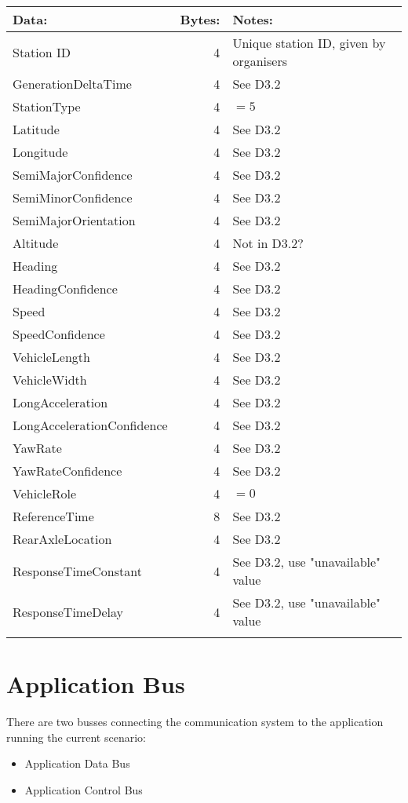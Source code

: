 \documentclass[11pt]{article}
\begin{document}
\begin{center}
\begin{tabular}{lrl}
Data: & Bytes: & Notes:\\
\hline
Station ID & 4 & Unique station ID, given by organisers\\
GenerationDeltaTime & 4 & See D3.2\\
StationType & 4 & \(=5\)\\
Latitude & 4 & See D3.2\\
Longitude & 4 & See D3.2\\
SemiMajorConfidence & 4 & See D3.2\\
SemiMinorConfidence & 4 & See D3.2\\
SemiMajorOrientation & 4 & See D3.2\\
Altitude & 4 & Not in D3.2?\\
Heading & 4 & See D3.2\\
HeadingConfidence & 4 & See D3.2\\
Speed & 4 & See D3.2\\
SpeedConfidence & 4 & See D3.2\\
VehicleLength & 4 & See D3.2\\
VehicleWidth & 4 & See D3.2\\
LongAcceleration & 4 & See D3.2\\
LongAccelerationConfidence & 4 & See D3.2\\
YawRate & 4 & See D3.2\\
YawRateConfidence & 4 & See D3.2\\
VehicleRole & 4 & \(=0\)\\
ReferenceTime & 8 & See D3.2\\
RearAxleLocation & 4 & See D3.2\\
ResponseTimeConstant & 4 & See D3.2, use "unavailable" value\\
ResponseTimeDelay & 4 & See D3.2, use "unavailable" value\\
 &  & \\
\end{tabular}
\end{center}



\section{Application Bus}
\label{sec:orgheadline3}
There are two busses connecting the communication system to the
application running the current scenario:
\begin{itemize}
\item Application Data Bus
\item Application Control Bus
\end{itemize}
\end{document}
